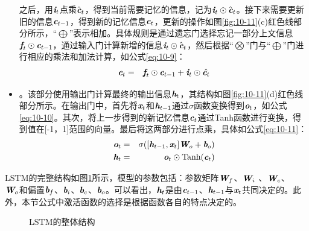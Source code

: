 \begin{itemize}
之后，用$\textbf{\em i}_t$点乘$\hat{\textbf{\em c}}_t$，得到当前需要记忆的信息，记为$\textbf{\em i}_t \odot  \hat{\textbf{\em c}}_t$。接下来需要更新旧的信息$\textbf{\em c}_{t-1}$，得到新的记忆信息$\textbf{\em c}_t$，更新的操作如图\ref{fig:10-11}(c)红色线部分所示，“$\bigoplus$”表示相加。具体规则是通过遗忘门选择忘记一部分上文信息$\textbf{\em f}_t \odot \textbf{\em c}_{t-1} $，通过输入门计算新增的信息$\textbf{\em i}_t \odot  \hat{\textbf{\em c}}_t$，然后根据“$\bigotimes$”门与“$\bigoplus$”门进行相应的乘法和加法计算，如公式\eqref{eq:10-9}：
\begin{eqnarray}
\textbf{\em c}_t &=& \textbf{\em f}_t \odot \textbf{\em c}_{t-1} + \textbf{\em i}_t  \odot \hat{\textbf{\em c}_t}
\label{eq:10-9}
\end{eqnarray}
\vspace{-1.0em}
\item {\small{}}。该部分使用输出门计算最终的输出信息$\textbf{\em h}_t$，其结构如图\ref{fig:10-11}(d)红色线部分所示。在输出门中，首先将$\textbf{\em x}_t$和$\textbf{\em h}_{t-1}$通过$\sigma$函数变换得到$\textbf{\em o}_t$，如公式\eqref{eq:10-10}。其次，将上一步得到的新记忆信息$\textbf{\em c}_t$通过Tanh函数进行变换，得到值在[-1，1]范围的向量。最后将这两部分进行点乘，具体如公式\eqref{eq:10-11}：
\begin{eqnarray}
\textbf{\em o}_t & = & \sigma ([\textbf{\em h}_{t-1},\textbf{\em x}_{t}] \textbf{\em W}_o + \textbf{\em b}_o ) \label{eq:10-10} \\
\textbf{\em h}_t & = & \textbf{\em o}_t \odot \textrm{Tanh} (\textbf{\em c}_t) \label{eq:10-11}
\end{eqnarray}
\vspace{0.5em}
\end{itemize}


\parinterval LSTM的完整结构如图\ref{fig:10-12}所示，模型的参数包括：参数矩阵$\textbf{\em W}_f$、$\textbf{\em W}_i$ 、$\textbf{\em W}_c$、\\$\textbf{\em W}_o$和偏置$\textbf{\em b}_f$、$\textbf{\em b}_i$、$\textbf{\em b}_c$、$\textbf{\em b}_o$。可以看出，$\textbf{\em h}_t$是由$\textbf{\em c}_{t-1}$、$\textbf{\em h}_{t-1}$与$\textbf{\em x}_t$共同决定的。此外，本节公式中激活函数的选择是根据函数各自的特点决定的。

\begin{figure}[htp]
\centering

\caption{LSTM的整体结构}
\label{fig:10-12}
\end{figure}


